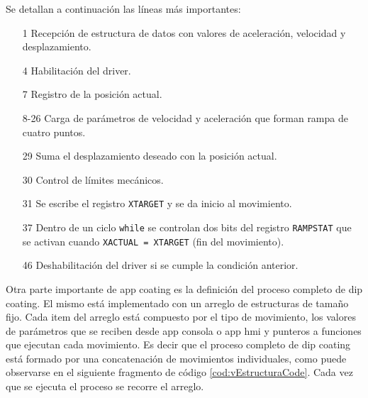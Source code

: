 Se detallan a continuación las líneas más importantes:

\begin{itemize}
\item [1] Recepción de estructura de datos con valores de aceleración, velocidad y desplazamiento.
\item [4] Habilitación del driver.
\item [7] Registro de la posición actual.
\item [8-26] Carga de parámetros de velocidad y aceleración que forman rampa de cuatro puntos.
\item [29] Suma el desplazamiento deseado con la posición actual.
\item [30] Control de límites mecánicos.
\item [31] Se escribe el registro \verb|XTARGET| y se da inicio al movimiento.
\item [37] Dentro de un ciclo \verb|while| se controlan dos bits del registro \verb|RAMPSTAT| que se activan cuando \verb|XACTUAL = XTARGET| (fin del movimiento).
\item [46] Deshabilitación del driver si se cumple la condición anterior.  
\end{itemize}


Otra parte importante de app coating es la definición del proceso completo de dip coating. El mismo está implementado con un arreglo de estructuras de tamaño fijo. Cada item del arreglo está compuesto por el tipo de movimiento, los valores de parámetros que se reciben desde app consola o app hmi y punteros a funciones que ejecutan cada movimiento. Es decir que el proceso completo de dip coating está formado por una concatenación de movimientos individuales, como puede observarse en el siguiente fragmento de código \ref{cod:vEstructuraCode}. Cada vez que se ejecuta el proceso se recorre el arreglo.




